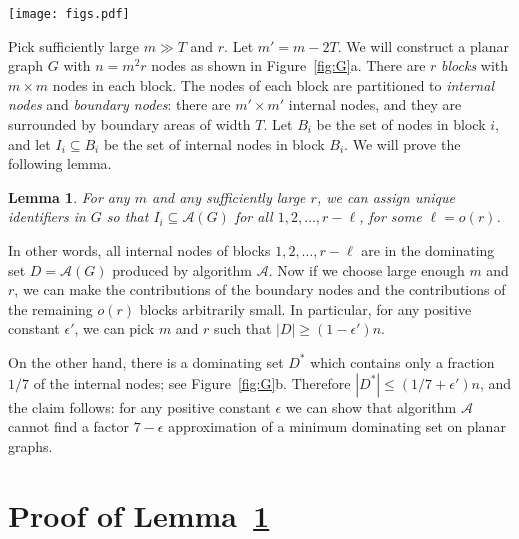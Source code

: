 \documentclass[11pt,a4paper]{article}
\newtheorem{lemma}[theorem]{Lemma}
\theoremstyle{definition}
\newcommand{\A}{\mathcal{A}}
\begin{document}
\begin{SCfigure}
\texttt{[image: figs.pdf]}
\caption{(a)~Construction of graph $G$ for $T = 1$, $m = 7$, and $r = 3$. There are $3$ blocks. In each block there are $7 \times 7$ nodes: $5 \times 5$ internal nodes (white area), surrounded by a boundary area of width $1$ (shaded). (b)~A dominating set $D^*$ of $G$ that contains only a fraction $1/7$ of internal nodes. (c)~The local output of an internal node $v$ (black node) only depends on its radius-$T$ neighbourhood (white nodes, here $T=2$). In particular, if we know the unique identifiers in the $k \times k$ region $R_v$ around $v$ (shaded area), we know the local output of node~$v$.}\label{fig:G}
\end{SCfigure}

Pick sufficiently large $m \gg T$ and $r$. Let $m' = m-2T$. We will construct a planar graph $G$ with $n = m^2 r$ nodes as shown in Figure~\ref{fig:G}a. There are $r$ \emph{blocks} with $m \times m$ nodes in each block. The nodes of each block are partitioned to \emph{internal nodes} and \emph{boundary nodes}: there are $m' \times m'$ internal nodes, and they are surrounded by boundary areas of width $T$. Let $B_i$ be the set of nodes in block $i$, and let $I_i \subseteq B_i$ be the set of internal nodes in block $B_i$. We will prove the following lemma.
\begin{lemma}\label{lem:main}
    For any $m$ and any sufficiently large $r$, we can assign unique identifiers in $G$ so that $I_i \subseteq \A(G)$ for all $1, 2, \dotsc, r-\ell$, for some $\ell = o(r)$.
\end{lemma}
In other words, all internal nodes of blocks $1, 2, \dotsc, r-\ell$ are in the dominating set $D = \A(G)$ produced by algorithm $\A$. Now if we choose large enough $m$ and $r$, we can make the contributions of the boundary nodes and the contributions of the remaining $o(r)$ blocks arbitrarily small. In particular, for any positive constant $\epsilon'$, we can pick $m$ and $r$ such that $|D| \ge (1-\epsilon') n$.

On the other hand, there is a dominating set $D^*$ which contains only a fraction $1/7$ of the internal nodes; see Figure~\ref{fig:G}b. Therefore $|D^*| \le (1/7 + \epsilon') n$, and the claim follows: for any positive constant $\epsilon$ we can show that algorithm $\A$ cannot find a factor $7-\epsilon$ approximation of a minimum dominating set on planar graphs.


\section{Proof of Lemma~\ref{lem:main}}
\end{document}

